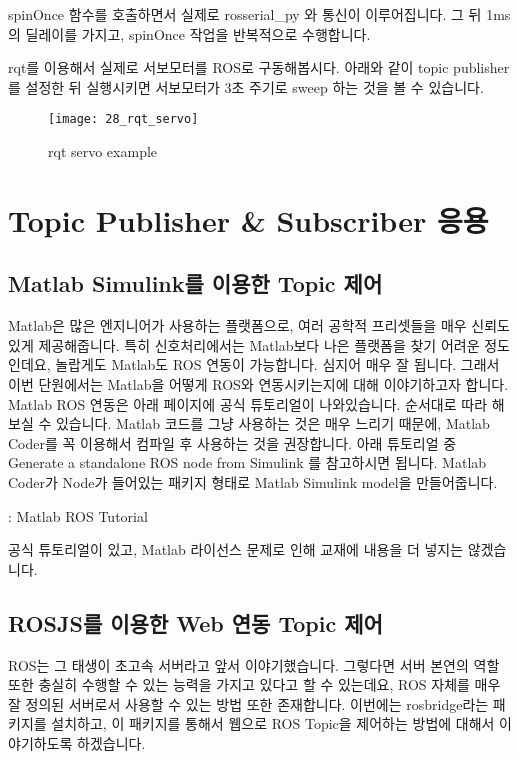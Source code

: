 \documentclass[11pt,fleqn]{book} %
\begin{document}
spinOnce 함수를 호출하면서 실제로 rosserial\_py 와 통신이 이루어집니다. 그 뒤 1ms의 딜레이를 가지고,
spinOnce 작업을 반복적으로 수행합니다.

rqt를 이용해서 실제로 서보모터를 ROS로 구동해봅시다. 아래와 같이 topic publisher를 설정한 뒤 실행시키면 서보모터가 3초 주기로 sweep 하는 것을 볼 수 있습니다.

\begin{figure}[h]
\centering\texttt{[image: 28\_rqt\_servo]}
\caption{rqt servo example}
\end{figure}

\section{Topic Publisher \& Subscriber 응용}

\subsection{Matlab Simulink를 이용한 Topic 제어}

Matlab은 많은 엔지니어가 사용하는 플랫폼으로, 여러 공학적 프리셋들을 매우 신뢰도 있게 제공해줍니다. 특히 신호처리에서는 Matlab보다 나은 플랫폼을 찾기 어려운 정도인데요,
놀랍게도 Matlab도 ROS 연동이 가능합니다. 심지어 매우 잘 됩니다. 그래서 이번 단원에서는 Matlab을 어떻게 ROS와 연동시키는지에 대해 이야기하고자 합니다.
Matlab ROS 연동은 아래 페이지에 공식 튜토리얼이 나와있습니다. 순서대로 따라 해 보실 수 있습니다.
Matlab 코드를 그냥 사용하는 것은 매우 느리기 때문에, Matlab Coder를 꼭 이용해서 컴파일 후 사용하는 것을 권장합니다.
아래 튜토리얼 중 Generate a standalone ROS node from Simulink 를 참고하시면 됩니다.
Matlab Coder가 Node가 들어있는 패키지 형태로 Matlab Simulink model을 만들어줍니다.

\begin{link}
  : Matlab ROS Tutorial
\end{link}

공식 튜토리얼이 있고, Matlab 라이선스 문제로 인해 교재에 내용을 더 넣지는 않겠습니다.


\subsection{ROSJS를 이용한 Web 연동 Topic 제어}

ROS는 그 태생이 초고속 서버라고 앞서 이야기했습니다. 그렇다면 서버 본연의 역할 또한 충실히 수행할 수 있는 능력을 가지고 있다고 할 수 있는데요, ROS 자체를 매우 잘 정의된 서버로서 사용할 수 있는 방법 또한 존재합니다.
이번에는 rosbridge라는 패키지를 설치하고, 이 패키지를 통해서 웹으로 ROS Topic을 제어하는 방법에 대해서 이야기하도록 하겠습니다.
\end{document}
